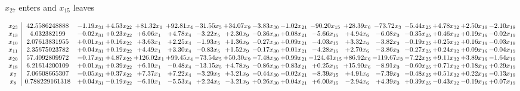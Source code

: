 \documentclass[9pt]{article}
\begin{document}
 $ x_{27} $ enters and $ x_{15} $ leaves 

 \[\begin{array}{c| c c@{\hskip 2pt} c@{\hskip 2pt} c@{\hskip 2pt} c@{\hskip 2pt} c@{\hskip 2pt} c@{\hskip 2pt} c@{\hskip 2pt} c@{\hskip 2pt} c@{\hskip 2pt} c@{\hskip 2pt} c@{\hskip 2pt} c@{\hskip 2pt} c@{\hskip 2pt} c@{\hskip 2pt} c@{\hskip 2pt} }
 x_{23}   &  42.5586248888 & -1.19 x_{31} & +  4.53 x_{22} & + 81.32 x_{1} & + 92.81 x_{4} & -31.55 x_{5} & + 34.07 x_{9} & -3.83 x_{30} & -1.02 x_{21} & -90.20 x_{15} & + 28.39 x_{6} & -73.72 x_{3} & -5.44 x_{25} & +  4.78 x_{32} & +  2.50 x_{16} & -2.10 x_{19}\\
 x_{13}   &  4.032382199 & -0.02 x_{31} & +  0.23 x_{22} & +  6.06 x_{1} & +  4.78 x_{4} & -3.22 x_{5} & +  2.30 x_{9} & -0.36 x_{30} & +  0.08 x_{21} & -5.66 x_{15} & +  4.94 x_{6} & -6.08 x_{3} & -0.35 x_{25} & +  0.46 x_{32} & +  0.19 x_{16} & -0.02 x_{19}\\
 x_{10}   &  2.07613831955 & +  0.01 x_{31} & +  0.16 x_{22} & +  3.63 x_{1} & +  2.25 x_{4} & -1.93 x_{5} & +  1.36 x_{9} & -0.27 x_{30} & +  0.09 x_{21} & -4.03 x_{15} & +  3.32 x_{6} & -3.82 x_{3} & -0.19 x_{25} & +  0.25 x_{32} & +  0.16 x_{16} & -0.03 x_{19}\\
 x_{11}   &  2.35675023782 & +  0.04 x_{31} & +  0.19 x_{22} & +  4.49 x_{1} & +  3.30 x_{4} & -0.83 x_{5} & +  1.52 x_{9} & -0.17 x_{30} & +  0.01 x_{21} & -4.28 x_{15} & +  2.70 x_{6} & -3.86 x_{3} & -0.27 x_{25} & +  0.24 x_{32} & +  0.09 x_{16} & -0.04 x_{19}\\
 x_{20}   &  57.4092809972 & -0.17 x_{31} & +  4.87 x_{22} & + 126.02 x_{1} & + 99.45 x_{4} & -73.54 x_{5} & + 50.30 x_{9} & -7.48 x_{30} & +  0.99 x_{21} & -124.43 x_{15} & + 86.92 x_{6} & -119.67 x_{3} & -7.22 x_{25} & +  9.11 x_{32} & +  3.89 x_{16} & -1.64 x_{19}\\
 x_{18}   &  6.21614200109 & +  0.01 x_{31} & +  0.39 x_{22} & +  6.10 x_{1} & -0.48 x_{4} & -13.15 x_{5} & +  4.78 x_{9} & -0.86 x_{30} & +  0.83 x_{21} & +  0.25 x_{15} & + 15.90 x_{6} & -8.91 x_{3} & -0.60 x_{25} & +  0.71 x_{32} & +  0.18 x_{16} & +  0.29 x_{19}\\
 x_{7}   &  7.06608665307 & -0.05 x_{31} & +  0.37 x_{22} & +  7.37 x_{1} & +  7.22 x_{4} & -3.29 x_{5} & +  3.21 x_{9} & -0.44 x_{30} & -0.02 x_{21} & -8.39 x_{15} & +  4.91 x_{6} & -7.39 x_{3} & -0.48 x_{25} & +  0.51 x_{32} & +  0.22 x_{16} & -0.13 x_{19}\\
 x_{8}   &  0.788229161318 & +  0.04 x_{31} & -0.19 x_{22} & -6.10 x_{1} & -5.53 x_{4} & +  2.24 x_{5} & -3.21 x_{9} & +  0.26 x_{30} & +  0.04 x_{21} & +  6.00 x_{15} & -2.94 x_{6} & +  4.39 x_{3} & +  0.39 x_{25} & -0.43 x_{32} & -0.19 x_{16} & +  0.07 x_{19}\\

\end{array}\]
\end{document}
